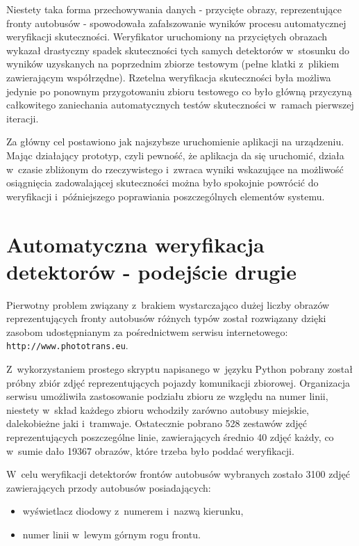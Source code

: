 Niestety taka forma przechowywania danych 
- przycięte obrazy, reprezentujące fronty autobusów - spowodowała zafałszowanie 
wyników procesu automatycznej weryfikacji skuteczności.
Weryfikator uruchomiony na przyciętych obrazach wykazał
drastyczny spadek skuteczności tych samych detektorów w~stosunku
do wyników uzyskanych na poprzednim zbiorze testowym (pełne klatki
z~plikiem zawierającym współrzędne).
Rzetelna weryfikacja skuteczności była możliwa jedynie po ponownym przygotowaniu
zbioru testowego co było główną przyczyną 
całkowitego zaniechania automatycznych testów skuteczności
w~ramach pierwszej iteracji.

Za główny cel postawiono jak najszybsze uruchomienie
aplikacji na urządzeniu. Mając działający prototyp, czyli
pewność, że aplikacja da się uruchomić, działa w~czasie zbliżonym
do rzeczywistego i~zwraca wyniki wskazujące na możliwość
osiągnięcia zadowalającej skuteczności można było spokojnie 
powrócić do weryfikacji i~późniejszego poprawiania
poszczególnych elementów systemu.

\section{Automatyczna weryfikacja detektorów - podejście drugie}

Pierwotny problem związany z~brakiem wystarczająco dużej liczby
obrazów reprezentujących fronty autobusów różnych typów został
rozwiązany dzięki zasobom udostępnianym za pośrednictwem serwisu
internetowego: \verb|http://www.phototrans.eu|.

Z~wykorzystaniem prostego skryptu napisanego w~języku Python pobrany
został próbny zbiór zdjęć reprezentujących pojazdy komunikacji
zbiorowej. Organizacja serwisu umożliwiła zastosowanie
podziału zbioru ze względu na numer linii, niestety
w~skład każdego zbioru wchodziły zarówno autobusy miejskie, dalekobieżne
jaki i~tramwaje. Ostatecznie pobrano 528 zestawów zdjęć reprezentujących
poszczególne linie, zawierających średnio 40 zdjęć każdy, co
w~sumie dało 19367 obrazów, które trzeba było poddać weryfikacji.

W~celu weryfikacji detektorów frontów autobusów wybranych zostało 3100
zdjęć zawierających przody autobusów posiadających:

\begin{itemize}
    \item wyświetlacz diodowy z~numerem i~nazwą kierunku,
    \item numer linii w~lewym górnym rogu frontu.
\end{itemize}

